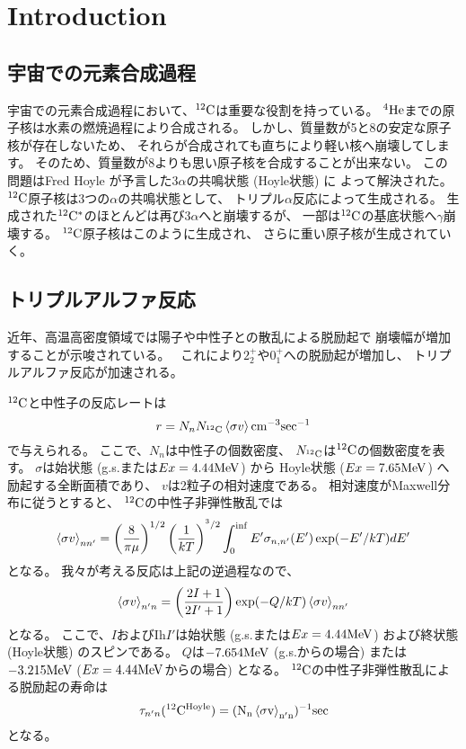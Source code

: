 \chapter{Introduction}
\section{宇宙での元素合成過程}
宇宙での元素合成過程において、${}^{12}\rm{C}$は重要な役割を持っている。
${}^{4}\rm{He}$までの原子核は水素の燃焼過程により合成される。
しかし、質量数が5と8の安定な原子核が存在しないため、
それらが合成されても直ちにより軽い核へ崩壊してします。
そのため、質量数が8よりも思い原子核を合成することが出来ない。
この問題はFred Hoyle が予言した$3\alpha$の共鳴状態 (Hoyle状態) に
よって解決された。
${}^{12}\rm{C}$原子核は3つの$\alpha$の共鳴状態として、
トリプル$\alpha$反応によって生成される。
生成された${}^{12}\rm{C}^{*}$のほとんどは再び$3\alpha$へと崩壊するが、
一部は${}^{12}\rm{C}$の基底状態へ$\gamma$崩壊する。
${}^{12}\rm{C}$原子核はこのように生成され、
さらに重い原子核が生成されていく。

\section{トリプルアルファ反応}
近年、高温高密度領域では陽子や中性子との散乱による脱励起で
崩壊幅が増加することが示唆されている。~\cite{hotdensemedium}
これにより$2_{2}^{+}$や$0_{1}^{+}$への脱励起が増加し、
トリプルアルファ反応が加速される。

${}^{12}\rm{C}$と中性子の反応レートは
\begin{equation}
  r = N_{n}N_{{}^{12}\rm{C}}\braket{\sigma v}\rm{cm}^{-3}\rm{sec}^{-1}
  \label{eq::r}
\end{equation}
で与えられる。
ここで、$N_{n}$は中性子の個数密度、
$N_{{}^{12}\rm{C}}$は${}^{12}\rm{C}$の個数密度を表す。
$\sigma$は始状態 (g.s.または$Ex = 4.44\rm{MeV}$) から
Hoyle状態 ($Ex=7.65\rm{MeV}$) へ励起する全断面積であり、
$v$は2粒子の相対速度である。
相対速度がMaxwell分布に従うとすると、
${}^{12}\rm{C}$の中性子非弾性散乱では
\begin{equation}
  \braket{\sigma v}_{nn'} =
  \left(\frac{8}{\pi\mu}\right)^{1/2}\left(\frac{1}{kT}\right)^{^3/2}
  \int^{\inf}_{0}E'\sigma_{n,n'}(E')\exp(-E'/kT)dE'
  \label{eq::sigmann'}
\end{equation}
となる。
我々が考える反応は上記の逆過程なので、
\begin{equation}
  \braket{\sigma v}_{n'n} = \left(\frac{2I+1}{2I'+1}\right)
  \exp(-Q/kT)\braket{\sigma v}_{nn'}
  \label{eq::sigman'n}
\end{equation}
となる。
ここで、$I$およびIh$I'$は始状態 (g.s.または$Ex = 4.44\rm{MeV}$)
および終状態 (Hoyle状態) のスピンである。
$Q$は$-7.654\rm{MeV}$ (g.s.からの場合) または
$-3.215\rm{MeV}$ ($Ex = 4.44\rm{MeV}$からの場合) となる。
${}^{12}\rm{C}$の中性子非弾性散乱による脱励起の寿命は
\begin{equation}
  \tau_{n'n}({}^{12}\rm{C}^{\rm{Hoyle}}) =
  (N_{n}\braket{\sigma v}_{n'n})^{-1} \rm{sec}
  \label{eq::tau}
\end{equation}
となる。

